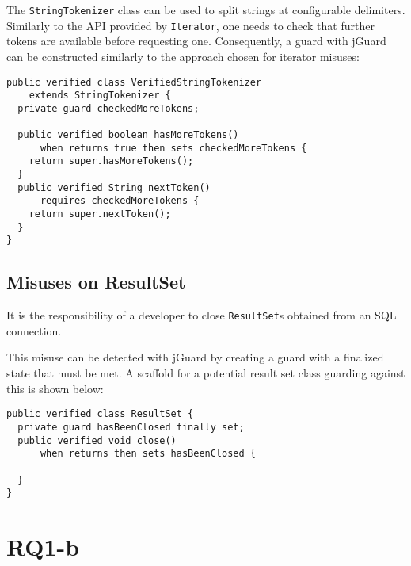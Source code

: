 \documentclass{article}
\begin{document}
The \texttt{StringTokenizer} class can be used to split strings at configurable
delimiters.
Similarly to the API provided by \texttt{Iterator}, one needs to check that further
tokens are available before requesting one.
Consequently, a guard with jGuard can be constructed similarly to the approach
chosen for iterator misuses:

\begin{lstlisting}[style=jGuard]
public verified class VerifiedStringTokenizer 
    extends StringTokenizer {
  private guard checkedMoreTokens;

  public verified boolean hasMoreTokens()
      when returns true then sets checkedMoreTokens {
    return super.hasMoreTokens();
  }
  public verified String nextToken()
      requires checkedMoreTokens {
    return super.nextToken();
  }
}
\end{lstlisting}

\subsection{Misuses on ResultSet}

It is the responsibility of a developer to close \texttt{ResultSet}s obtained
from an SQL connection.

This misuse can be detected with jGuard by creating a guard with a finalized
state that must be met.
A scaffold for a potential result set class guarding against this is shown below:

\begin{lstlisting}[style=jGuard]
public verified class ResultSet {
  private guard hasBeenClosed finally set;
  public verified void close()
      when returns then sets hasBeenClosed {

  }
}
\end{lstlisting}



\section{RQ1-b}
\end{document}
